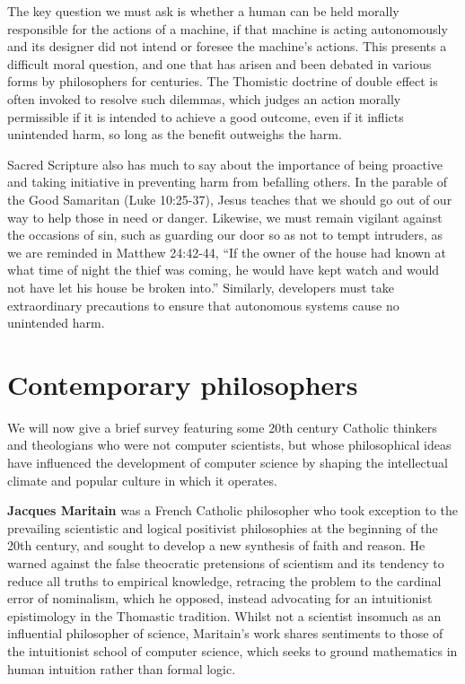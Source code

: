 \documentclass[sigplan,nonacm]{acmart}\settopmatter{printfolios=false,printccs=false,printacmref=false}
\begin{document}
The key question we must ask is whether a human can be held morally responsible for the actions of a machine, if that machine is acting autonomously and its designer did not intend or foresee the machine's actions. This presents a difficult moral question, and one that has arisen and been debated in various forms by philosophers for centuries. The Thomistic doctrine of double effect is often invoked to resolve such dilemmas, which judges an action morally permissible if it is intended to achieve a good outcome, even if it inflicts unintended harm, so long as the benefit outweighs the harm.

Sacred Scripture also has much to say about the importance of being proactive and taking initiative in preventing harm from befalling others. In the parable of the Good Samaritan (Luke 10:25-37), Jesus teaches that we should go out of our way to help those in need or danger. Likewise, we must remain vigilant against the occasions of sin, such as guarding our door so as not to tempt intruders, as we are reminded in Matthew 24:42-44, ``If the owner of the house had known at what time of night the thief was coming, he would have kept watch and would not have let his house be broken into.'' Similarly, developers must take extraordinary precautions to ensure that autonomous systems cause no unintended harm.


\section{Contemporary philosophers}

We will now give a brief survey featuring some 20th century Catholic thinkers and theologians who were not computer scientists, but whose philosophical ideas have influenced the development of computer science by shaping the intellectual climate and popular culture in which it operates.

\textbf{Jacques Maritain} was a French Catholic philosopher who took exception to the prevailing scientistic and logical positivist philosophies at the beginning of the 20th century, and sought to develop a new synthesis of faith and reason. He warned against the false theocratic pretensions of scientism and its tendency to reduce all truths to empirical knowledge, retracing the problem to the cardinal error of nominalism, which he opposed, instead advocating for an intuitionist epistimology in the Thomastic tradition. Whilst not a scientist insomuch as an influential philosopher of science, Maritain's work shares sentiments to those of the intuitionist school of computer science, which seeks to ground mathematics in human intuition rather than formal logic.
\end{document}
